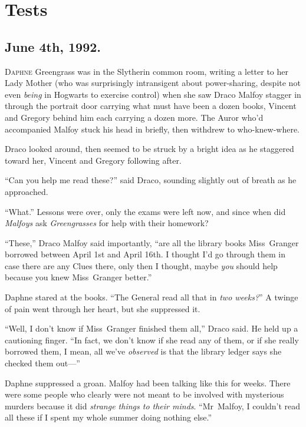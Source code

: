 \chapter{Tests}

\section{June 4th, 1992.}

\lettrine{D}{aphne} Greengrass was in the Slytherin common room, writing a letter to her
Lady Mother (who was surprisingly intransigent about power-sharing, despite not
even \emph{being} in Hogwarts to exercise control) when she saw Draco Malfoy
stagger in through the portrait door carrying what must have been a dozen
books, Vincent and Gregory behind him each carrying a dozen more. The Auror
who’d accompanied Malfoy stuck his head in briefly, then withdrew to
who-knew-where.

Draco looked around, then seemed to be struck by a bright idea as he staggered
toward her, Vincent and Gregory following after.

“Can you help me read these?” said Draco, sounding slightly out of breath as he
approached.

“What.” Lessons were over, only the exams were left now, and since when
did \emph{Malfoys} ask \emph{Greengrasses} for help with their homework?

“These,” Draco Malfoy said importantly, “are all the library books Miss~Granger
borrowed between April 1st and April 16th. I thought I’d go through them in
case there are any Clues there, only then I thought, maybe \emph{you} should
help because you knew Miss~Granger better.”

Daphne stared at the books. “The General read all that in \emph{two weeks?}” A
twinge of pain went through her heart, but she suppressed it.

“Well, I don’t know if Miss~Granger finished them all,” Draco said. He held up
a cautioning finger. “In fact, we don’t know if she read any of them, or if she
really borrowed them, I mean, all we’ve \emph{observed} is that the library
ledger says she checked them out—”

Daphne suppressed a groan. Malfoy had been talking like this for weeks. There
were some people who clearly were not meant to be involved with mysterious
murders because it did \emph{strange things to their minds}. “Mr~Malfoy, I
couldn’t read all these if I spent my whole summer doing nothing else.”


